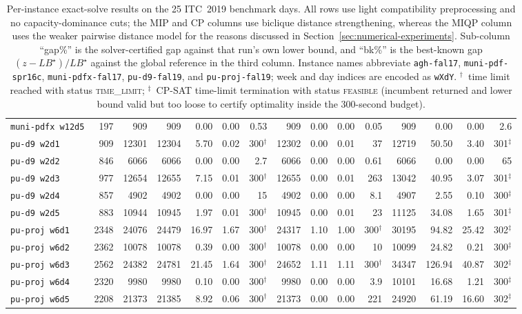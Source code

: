 \documentclass[11pt]{article}
\begin{document}
\begin{table}[ht]
\begin{tabular}{@{}lrr rrrr rrrr rrrr@{}}
\texttt{muni-pdfx w12d5} & 197 & 909 & 909 & 0.00 & 0.00 & 0.53 & 909 & 0.00 & 0.00 & 0.05 & 909 & 0.00 & 0.00 & 2.6 \\
\texttt{pu-d9 w2d1} & 909 & 12301 & 12304 & 5.70 & 0.02 & 300$^\dagger$ & 12302 & 0.00 & 0.01 & 37 & 12719 & 50.50 & 3.40 & 301$^\ddagger$ \\
\texttt{pu-d9 w2d2} & 846 & 6066 & 6066 & 0.00 & 0.00 & 2.7 & 6066 & 0.00 & 0.00 & 0.61 & 6066 & 0.00 & 0.00 & 65 \\
\texttt{pu-d9 w2d3} & 977 & 12654 & 12655 & 7.15 & 0.01 & 300$^\dagger$ & 12655 & 0.00 & 0.01 & 263 & 13042 & 40.95 & 3.07 & 301$^\ddagger$ \\
\texttt{pu-d9 w2d4} & 857 & 4902 & 4902 & 0.00 & 0.00 & 15 & 4902 & 0.00 & 0.00 & 8.1 & 4907 & 2.55 & 0.10 & 300$^\ddagger$ \\
\texttt{pu-d9 w2d5} & 883 & 10944 & 10945 & 1.97 & 0.01 & 300$^\dagger$ & 10945 & 0.00 & 0.01 & 23 & 11125 & 34.08 & 1.65 & 301$^\ddagger$ \\
\texttt{pu-proj w6d1} & 2348 & 24076 & 24479 & 16.97 & 1.67 & 300$^\dagger$ & 24317 & 1.10 & 1.00 & 300$^\dagger$ & 30195 & 94.82 & 25.42 & 302$^\ddagger$ \\
\texttt{pu-proj w6d2} & 2362 & 10078 & 10078 & 0.39 & 0.00 & 300$^\dagger$ & 10078 & 0.00 & 0.00 & 10 & 10099 & 24.82 & 0.21 & 300$^\ddagger$ \\
\texttt{pu-proj w6d3} & 2562 & 24382 & 24781 & 21.45 & 1.64 & 300$^\dagger$ & 24652 & 1.11 & 1.11 & 300$^\dagger$ & 34347 & 126.94 & 40.87 & 302$^\ddagger$ \\
\texttt{pu-proj w6d4} & 2320 & 9980 & 9980 & 0.10 & 0.00 & 300$^\dagger$ & 9980 & 0.00 & 0.00 & 3.9 & 10101 & 16.68 & 1.21 & 300$^\ddagger$ \\
\texttt{pu-proj w6d5} & 2208 & 21373 & 21385 & 8.92 & 0.06 & 300$^\dagger$ & 21373 & 0.00 & 0.00 & 221 & 24920 & 61.19 & 16.60 & 302$^\ddagger$ \\
\hline
\end{tabular}
\caption{Per-instance exact-solve results on the 25 ITC~2019 benchmark days.
All rows use light compatibility preprocessing and no capacity-dominance cuts;
the MIP and CP columns use biclique distance strengthening, whereas the MIQP
column uses the weaker pairwise distance model for the reasons discussed in
Section~\ref{sec:numerical-experiments}. Sub-column ``gap\%'' is the
solver-certified gap against that run's own lower bound, and ``bk\%'' is the
best-known gap $(z-LB^\star)/LB^\star$ against the global reference in the
third column. Instance names abbreviate
\texttt{agh-fal17}, \texttt{muni-pdf-spr16c}, \texttt{muni-pdfx-fal17},
\texttt{pu-d9-fal19}, and \texttt{pu-proj-fal19}; week and day indices are
encoded as \texttt{wXdY}. $^\dagger$~time limit reached with status
\textsc{time\_limit}; $^\ddagger$~CP-SAT time-limit termination with
status \textsc{feasible} (incumbent returned and lower bound valid but
too loose to certify optimality inside the $300$-second budget).}
\label{tab:app-exact-itc}
\end{table}
\end{document}
